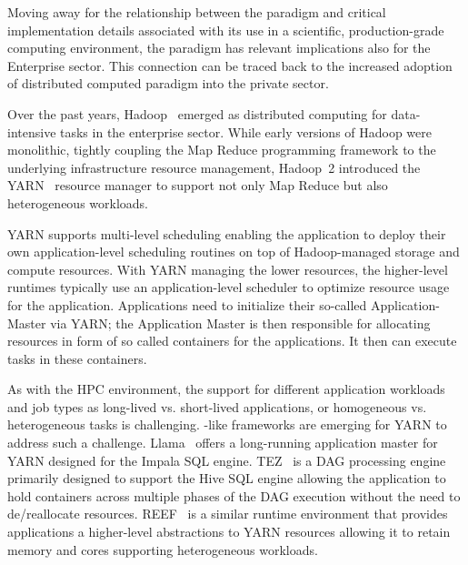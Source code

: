 \documentclass{sig-alternate}
\begin{document}
Moving away for the relationship between the \pilot paradigm and critical
implementation details associated with its use in a scientific,
production-grade computing environment, the \pilot paradigm has relevant
implications also for the Enterprise sector. This connection can be traced back
to the increased adoption of distributed computed paradigm into the private
sector.

Over the past years, Hadoop~\cite{hadoop} emerged as distributed computing for
data-intensive tasks in the enterprise sector. While early versions of Hadoop
were monolithic, tightly coupling the Map Reduce programming framework to the
underlying infrastructure resource management, Hadoop~2 introduced the
YARN~\cite{yarn-paper} resource manager to support not only Map Reduce but also
heterogeneous workloads.

YARN supports multi-level scheduling enabling the application to deploy their
own application-level scheduling routines on top of Hadoop-managed storage and
compute resources. With YARN managing the lower resources, the higher-level
runtimes typically use an application-level scheduler to optimize resource
usage for the application. Applications need to initialize their so-called
Application-Master via YARN; the Application Master is then responsible for
allocating resources in form of so called containers for the applications. It
then can execute tasks in these containers.

As with the HPC environment, the support for different application workloads
and job types as long-lived vs. short-lived applications, or homogeneous vs.
heterogeneous tasks is challenging. \pilot-like frameworks are emerging for
YARN to address such a challenge. Llama~\cite{llama} offers a long-running
application master for YARN designed for the Impala SQL engine. TEZ~\cite{tez}
is a DAG processing engine primarily designed to support the Hive SQL engine
allowing the application to hold containers across multiple phases of the DAG
execution without the need to de/reallocate resources.
REEF~\cite{Chun:2013:RRE:2536274.2536318} is a similar runtime environment that
provides applications a higher-level abstractions to YARN resources allowing it
to retain memory and cores supporting heterogeneous workloads.

 
\end{document}
